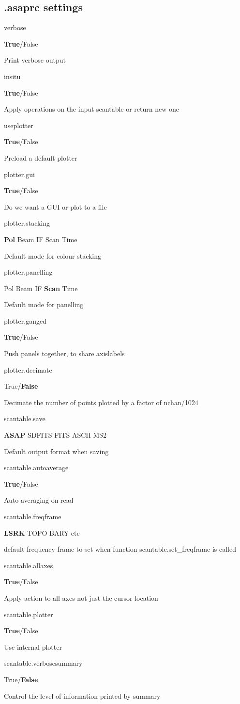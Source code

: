 \documentclass[11pt]{article}
\newcommand{\asaprc}[3]{
  \begin{minipage}[t]{45mm}#1\end{minipage}
  \begin{minipage}[t]{30mm}\raggedright #2\end{minipage}\hspace{3mm}
  \begin{minipage}[t]{\textwidth-75mm}#3\end{minipage}
}
\begin{document}
\subsection{.asaprc settings}
\asaprc{verbose}{{\bf True}/False}{Print verbose output}

\asaprc{insitu}{{\bf True}/False}{Apply operations on the input
scantable or return new one}


\asaprc{useplotter}{{\bf True}/False}{Preload a default plotter}

\asaprc{plotter.gui}{{\bf True}/False}{Do we want a GUI or plot to a
file}

\asaprc{plotter.stacking}{{\bf Pol} Beam IF Scan Time}{Default mode for
colour stacking}

\asaprc{plotter.panelling}{Pol Beam IF {\bf Scan} Time}{Default mode
for panelling}

\asaprc{plotter.ganged}{{\bf True}/False}{Push panels together, to
share axislabels}

\asaprc{plotter.decimate}{True/{\bf False}}{Decimate the number of
points plotted by a factor of nchan/1024}


\asaprc{scantable.save}{{\bf ASAP} SDFITS FITS ASCII MS2}{Default output
format when saving}

\asaprc{scantable.autoaverage}{{\bf True}/False}{Auto averaging on
read}

\asaprc{scantable.freqframe}{{\bf LSRK} TOPO BARY etc}{default
frequency frame to set when function scantable.set\_freqframe is
called}

\asaprc{scantable.allaxes}{{\bf True}/False}{Apply action to all axes
not just the cursor location}

\asaprc{scantable.plotter}{{\bf True}/False}{Use internal plotter}

\asaprc{scantable.verbosesummary}{True/{\bf False}}{Control the level
of information printed by summary}

\printindex
\end{document}

